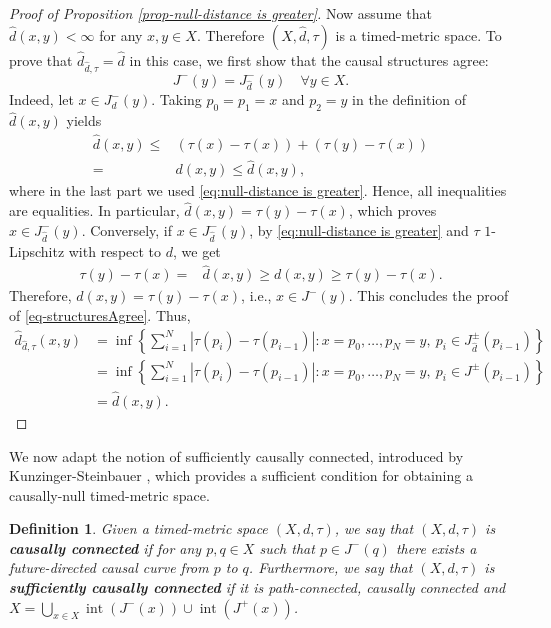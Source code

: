 \documentclass[a4paper,12pt,reqno]{amsart}
\theoremstyle{plain}
\newtheorem{defn}[thm]{Definition}
\DeclareMathOperator{\interior}{int}
\begin{document}
\begin{proof}[Proof of Proposition \ref{prop-null-distance is greater}]
Now assume that $\hat{d}(x,y)<\infty$ for any $x,y\in X$. Therefore $(X,\hat{d},\tau)$ is a timed-metric space. To prove that $\hat{d}_{\hat{d},\tau}= \hat d$ in this case, we first show that the causal structures agree:
\begin{equation}\label{eq-structuresAgree}
    J^-(y)=J^-_{\hat{d}}(y) \quad \forall y \in X. 
\end{equation}
Indeed, let $x\in J^-_{d}(y)$. Taking $p_0 = p_1 = x$ and $p_2 = y$ in the definition of $\hat{d}(x,y)$ yields 
\begin{align*}
\hat{d}(x,y) \leq & (\tau(x)-\tau(x)) + (\tau(y) - \tau(x)) \\
= & d(x,y) \leq \hat{d}(x,y), 
\end{align*}
where in the last part we used \eqref{eq:null-distance is greater}.
Hence, all inequalities are equalities. In particular,  $\hat{d}(x,y) = \tau(y)-\tau(x)$, which proves $x\in J^-_{\hat{d}}(y)$.  Conversely, if $x\in J^-_{\hat{d}}(y)$, by \eqref{eq:null-distance is greater} and $\tau$  $1$-Lipschitz with respect to $d$, we get
\begin{align*}
\tau(y) - \tau(x) = & \hat{d}(x,y)  
\geq  d(x,y) \geq \tau(y)-\tau(x).
\end{align*}
Therefore, $d(x,y) = \tau(y)-\tau(x)$, i.e., 
$x\in J^-(y)$. This concludes the proof of \eqref{eq-structuresAgree}. Thus, 
\begin{align*}
\hat{d}_{\hat{d}, \tau}(x,y) 
&= \inf\left\{\sum_{i=1}^{N} |\tau(p_i)-\tau(p_{i-1})| : x=p_0,\dots, p_{N}=y,\ p_{i}\in J^\pm_{\hat{d}}(p_{i-1})\right\}\\
&= \inf\left\{\sum_{i=1}^{N} |\tau(p_i)-\tau(p_{i-1})| : x=p_0,\dots, p_{N}=y,\ p_{i}\in J^\pm(p_{i-1})\right\}\\
&= \hat{d}(x,y).
\end{align*}
\end{proof}



We now adapt the notion of sufficiently causally connected, introduced 
by Kunzinger-Steinbauer \cite{Kunzinger-Steinbauer-22}, which provides a sufficient condition for obtaining a causally-null timed-metric space. 


\begin{defn}
Given a timed-metric space $(X,d,\tau)$, 
we say that $(X,d,\tau)$ is \textbf{causally connected} if for any $p,q\in X$ such that $p\in J^-(q)$ there exists a future-directed causal curve from $p$ to $q$. Furthermore, we say that $(X,d,\tau)$ is \textbf{sufficiently causally connected} if it is path-connected, causally connected and $X = \bigcup_{x\in X} \interior(J^-(x))\cup \interior(J^+(x))$.
\end{defn}
\end{document}
